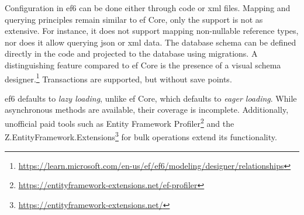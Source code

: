 Configuration in \acrshort{ef}6 can be done either through code or \acrshort{xml} files. Mapping and querying principles remain similar to \acrshort{ef} Core, only the support is not as extensive. For instance, it does not support mapping non-nullable reference types, nor does it allow querying \acrshort{json} or \acrshort{xml} data.
The database schema can be defined directly in the code and projected to the database using migrations. A distinguishing feature compared to \acrshort{ef} Core is the presence of a visual schema designer.\footnote{\url{https://learn.microsoft.com/en-us/ef/ef6/modeling/designer/relationships}} Transactions are supported, but without save points. 

\acrshort{ef}6 defaults to \textit{lazy loading}, unlike \acrshort{ef} Core, which defaults to \textit{eager loading}. While asynchronous methods are available, their coverage is incomplete. Additionally, unofficial paid tools such as Entity Framework Profiler\footnote{\url{https://entityframework-extensions.net/ef-profiler}} and the Z.EntityFramework.Extensions\footnote{\url{https://entityframework-extensions.net/}} for bulk operations extend its functionality.

